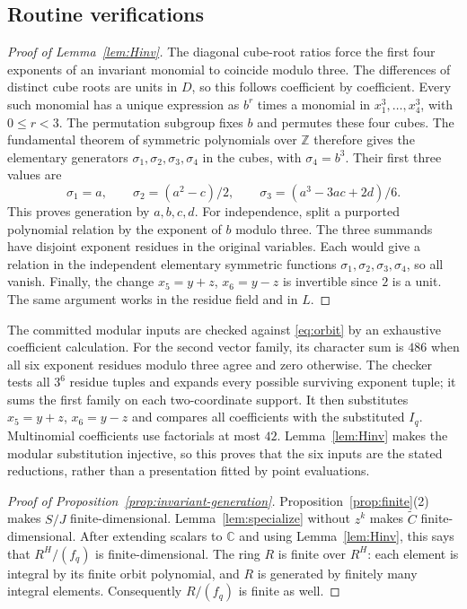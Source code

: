 \documentclass[11pt]{article}
\theoremstyle{definition}
\newcommand{\C}{\mathbb C}
\newcommand{\Z}{\mathbb Z}
\begin{document}
\begin{appendices}
\section{Routine verifications}\label{app:routine}
\begin{proof}[Proof of Lemma~\ref{lem:Hinv}]
The diagonal cube-root ratios force the first four exponents of an
invariant monomial to coincide modulo three. The differences of
distinct cube roots are units in $D$, so this follows coefficient by
coefficient. Every such monomial has a unique expression as $b^r$
times a monomial in $x_1^3,\ldots,x_4^3$, with $0\leq r<3$.
The permutation subgroup fixes $b$ and permutes these four cubes.
The fundamental theorem of symmetric polynomials over $\Z$ therefore
gives the elementary generators $\sigma_1,\sigma_2,\sigma_3,\sigma_4$ in the cubes, with
$\sigma_4=b^3$. Their first three values are
\[
        \sigma_1=a,\qquad \sigma_2=(a^2-c)/2,\qquad
                            \sigma_3=(a^3-3ac+2d)/6.
\]
This proves generation by $a,b,c,d$. For independence, split a
purported polynomial relation by the exponent of $b$ modulo three.
The three summands have disjoint exponent residues in the original
variables. Each would give a relation in the independent elementary
symmetric functions $\sigma_1,\sigma_2,\sigma_3,\sigma_4$, so all vanish. Finally, the
change $x_5=y+z$, $x_6=y-z$ is invertible since $2$ is a unit.
The same argument works in the residue field and in $L$.
\end{proof}

The committed modular inputs are checked against \eqref{eq:orbit}
by an exhaustive coefficient calculation. For the second vector
family, its character sum is $486$ when all six exponent residues
modulo three agree and zero otherwise. The checker tests all $3^6$
residue tuples and expands every possible surviving exponent tuple;
it sums the first family on each two-coordinate support. It then
substitutes $x_5=y+z$, $x_6=y-z$ and compares all coefficients with
the substituted $I_q$. Multinomial coefficients use factorials at most
$42$. Lemma~\ref{lem:Hinv} makes the modular substitution injective,
so this proves that the six inputs are the stated reductions, rather
than a presentation fitted by point evaluations.

\begin{proof}[Proof of Proposition~\ref{prop:invariant-generation}]
Proposition~\ref{prop:finite}(2) makes $S/J$ finite-dimensional.
Lemma~\ref{lem:specialize} without $z^k$ makes $\widetilde C$
finite-dimensional. After extending scalars to $\C$ and using
Lemma~\ref{lem:Hinv}, this says that $R^H/(f_q)$ is
finite-dimensional. The ring $R$ is finite over $R^H$: each element
is integral by its finite orbit polynomial, and $R$ is generated by
finitely many integral elements. Consequently $R/(f_q)$ is finite
as well.


\end{proof}
\end{appendices}
\end{document}
